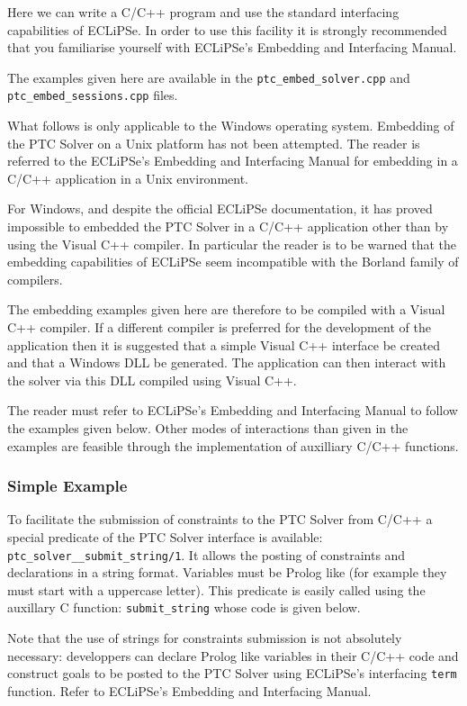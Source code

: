\documentclass{article}
\begin{document}
Here we can write a C/C++ program and use the standard interfacing capabilities
of ECLiPSe.
In order to use this facility it is strongly recommended that you familiarise
yourself
with ECLiPSe's Embedding and Interfacing Manual.

The examples given here are available in the \verb+ptc_embed_solver.cpp+ and
\verb+ptc_embed_sessions.cpp+ files.

What follows is only applicable to the Windows operating system. Embedding of
the PTC Solver on a Unix platform has not been attempted. The reader is referred
to the ECLiPSe's Embedding and Interfacing Manual for embedding in a C/C++
application in a Unix environment.

For Windows, and despite the official ECLiPSe documentation, it has proved
impossible to embedded the PTC Solver in a C/C++ application other than by using
the Visual C++ compiler. In particular the reader is to be warned that the
embedding capabilities of ECLiPSe seem incompatible with the Borland family of
compilers.

The embedding examples given here are therefore to be compiled with a Visual C++
compiler. If a different compiler is preferred for the development of the
application then it is suggested that a simple Visual C++ interface be created
and
that a Windows DLL be generated. The application can then interact with the
solver via this DLL compiled using Visual C++.

The reader must refer to ECLiPSe's Embedding and Interfacing Manual to follow the
examples
given below. Other modes of interactions than given in the examples are feasible
through the implementation of auxilliary C/C++ functions.

\subsubsection{Simple Example}

To facilitate the submission of constraints to the PTC Solver from C/C++ a
special predicate of the PTC Solver interface is available:
\verb+ptc_solver__submit_string/1+. It allows the posting of constraints and
declarations in a string format. Variables must be Prolog like (for example they
must start with a uppercase letter). This predicate is easily called using the
auxillary C function: \verb+submit_string+ whose code is given below.

Note
that the use of strings for constraints submission is not absolutely necessary:
developpers can declare Prolog like variables in their C/C++ code and construct
goals to be posted to the PTC Solver using ECLiPSe's interfacing \verb+term+
function. Refer to ECLiPSe's Embedding and Interfacing Manual.
\end{document}
